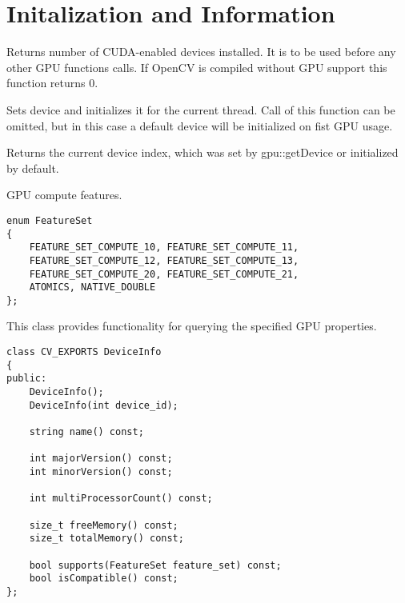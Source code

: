 \section{Initalization and Information}


Returns number of CUDA-enabled devices installed. It is to be used before any other GPU functions calls. If OpenCV is compiled without GPU support this function returns 0. 



Sets device and initializes it for the current thread. Call of this function can be omitted, but in this case a default device will be initialized on fist GPU usage.

\begin{description}
\end{description}


Returns the current device index, which was set by {gpu::getDevice} or initialized by default.



\label{cpp.gpu.FeatureSet}
GPU compute features.

\begin{lstlisting}
enum FeatureSet
{
    FEATURE_SET_COMPUTE_10, FEATURE_SET_COMPUTE_11,
    FEATURE_SET_COMPUTE_12, FEATURE_SET_COMPUTE_13,
    FEATURE_SET_COMPUTE_20, FEATURE_SET_COMPUTE_21,
    ATOMICS, NATIVE_DOUBLE
};
\end{lstlisting}


This class provides functionality for querying the specified GPU properties. 

\begin{lstlisting}
class CV_EXPORTS DeviceInfo
{
public:
    DeviceInfo();
    DeviceInfo(int device_id);

    string name() const;

    int majorVersion() const;
    int minorVersion() const;

    int multiProcessorCount() const;

    size_t freeMemory() const;
    size_t totalMemory() const;

    bool supports(FeatureSet feature_set) const;
    bool isCompatible() const;
};
\end{lstlisting}


